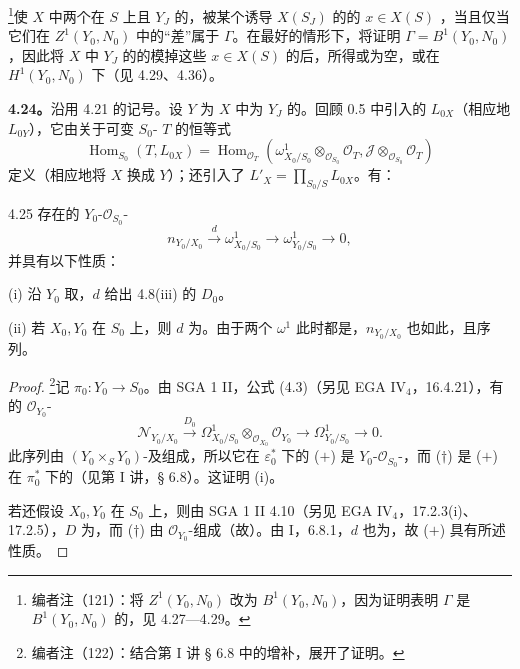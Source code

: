\footnote{编者注（121）：将 $Z^1(Y_0,N_0)$ 改为 $B^1(Y_0,N_0)$，因为证明表明 $\Gamma$ 是 $B^1(Y_0,N_0)$ 的，见 4.27—4.29。}使 $X$ 中两个在 $S$ 上且 $Y_J$ 的，被某个诱导 $X(S_J)$ 的的 $x\in X(S)$ ，当且仅当它们在 $Z^1(Y_0,N_0)$ 中的“差”属于 $\Gamma$。在最好的情形下，将证明 $\Gamma=B^1(Y_0,N_0)$，因此将 $X$ 中 $Y_J$ 的的模掉这些 $x\in X(S)$ 的后，所得或为空，或在 $H^1(Y_0,N_0)$ 下（见 4.29、4.36）。

\textbf{4.24。}沿用 4.21 的记号。设 $Y$ 为 $X$ 中为 $Y_J$ 的。回顾 0.5 中引入的 $L_{0X}$（相应地 $L_{0Y}$），它由关于可变 $S_0$- $T$ 的恒等式
\[\operatorname{Hom}_{S_0}(T,L_{0X})=\operatorname{Hom}_{\mathscr O_T}(\omega^1_{X_0/S_0}\otimes_{\mathscr O_{S_0}}\mathscr O_T,\mathscr J\otimes_{\mathscr O_{S_0}}\mathscr O_T)\]
定义（相应地将 $X$ 换成 $Y$）；还引入了 $L'_X=\prod_{S_0/S}L_{0X}$。有：
\begin{SGAresult}{}{4.25}
存在的 $Y_0$-$\mathscr O_{S_0}$-
\[n_{Y_0/X_0}\xrightarrow d\omega^1_{X_0/S_0}\longrightarrow\omega^1_{Y_0/S_0}\longrightarrow0,\tag{$+$}\]
并具有以下性质：

(i) 沿 $Y_0$ 取，$d$ 给出 4.8(iii) 的 $D_0$。

(ii) 若 $X_0,Y_0$ 在 $S_0$ 上，则 $d$ 为。由于两个 $\omega^1$ 此时都是，$n_{Y_0/X_0}$ 也如此，且序列。
\end{SGAresult}
\begin{proof}
\footnote{编者注（122）：结合第 I 讲 § 6.8 中的增补，展开了证明。}记 $\pi_0:Y_0\to S_0$。由 SGA 1 II，公式 (4.3)（另见 EGA IV$_4$，16.4.21），有的 $\mathscr O_{Y_0}$-
\[\mathscr N_{Y_0/X_0}\xrightarrow{D_0}\Omega^1_{X_0/S_0}\otimes_{\mathscr O_{X_0}}\mathscr O_{Y_0}\longrightarrow\Omega^1_{Y_0/S_0}\longrightarrow0.\tag{$\dagger$}\]
此序列由 $(Y_0\times_S Y_0)$-及组成，所以它在 $\varepsilon_0^*$ 下的 ($+$) 是 $Y_0$-$\mathscr O_{S_0}$-，而 ($\dagger$) 是 ($+$) 在 $\pi_0^*$ 下的（见第 I 讲，§ 6.8）。这证明 (i)。

若还假设 $X_0,Y_0$ 在 $S_0$ 上，则由 SGA 1 II 4.10（另见 EGA IV$_4$，17.2.3(i)、17.2.5），$D$ 为，而 ($\dagger$) 由 $\mathscr O_{Y_0}$-组成（故）。由 I，6.8.1，$d$ 也为，故 ($+$) 具有所述性质。
\end{proof}
